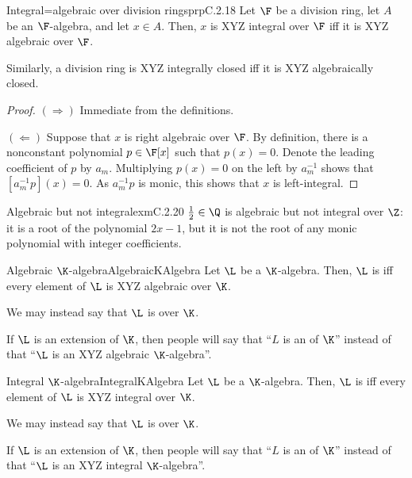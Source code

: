\begin{mpr}{Integral=algebraic over division rings}{prpC.2.18}
	Let $\F$ be a division ring, let $A$ be an $\F$-algebra, and let $x\in A$.  Then, $x$ is XYZ integral over $\F$ iff it is XYZ algebraic over $\F$.
	\begin{rmk}
		Similarly, a division ring is XYZ integrally closed iff it is XYZ algebraically closed.
	\end{rmk}
	\begin{proof}
		$(\Rightarrow )$ Immediate from the definitions.
		
		\blni
		$(\Leftarrow )$ Suppose that $x$ is right algebraic over $\F$.  By definition, there is a nonconstant polynomial $p\in \F [x]$ such that $p(x)=0$.  Denote the leading coefficient of $p$ by $a_m$.  Multiplying $p(x)=0$ on the left by $a_m^{-1}$ shows that $[a_m^{-1}p](x)=0$.  As $a_m^{-1}p$ is monic, this shows that $x$ is left-integral.
	\end{proof}
\end{mpr}
\begin{exm}{Algebraic but not integral}{exmC.2.20}
	$\frac{1}{2}\in \Q$ is algebraic but not integral over $\Z$:  it is a root of the polynomial $2x-1$, but it is not the root of any monic polynomial with integer coefficients.
\end{exm}
\begin{mdf}{Algebraic $\K$-algebra}{AlgebraicKAlgebra}
	Let $\L$ be a $\K$-algebra.  Then, $\L$ is  iff every element of $\L$ is XYZ algebraic over $\K$.
	\begin{rmk}
		We may instead say that $\L$ is  over $\K$.
	\end{rmk}
	\begin{rmk}
		If $\L$ is an extension of $\K$, then people will say that ``$L$ is an  of $\K$'' instead of that ``$\L$ is an XYZ algebraic $\K$-algebra''.
	\end{rmk}
\end{mdf}
\begin{mdf}{Integral $\K$-algebra}{IntegralKAlgebra}
	Let $\L$ be a $\K$-algebra.  Then, $\L$ is  iff every element of $\L$ is XYZ integral over $\K$.
	\begin{rmk}
		We may instead say that $\L$ is  over $\K$.
	\end{rmk}
	\begin{rmk}
		If $\L$ is an extension of $\K$, then people will say that ``$L$ is an  of $\K$'' instead of that ``$\L$ is an XYZ integral $\K$-algebra''.
	\end{rmk}
\end{mdf}
